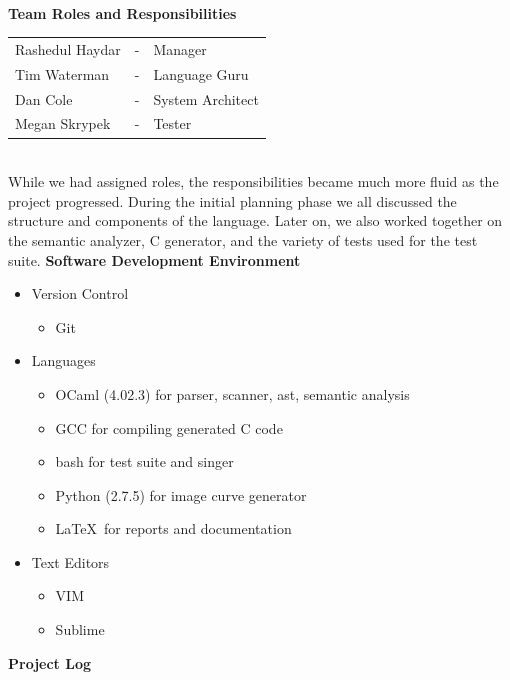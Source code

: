 \documentclass[11pt, oneside]{article}   	%
\newcommand{\tab} {\hspace*{2em}}
\begin{document}
\tab\\[3em]
\Large\textbf{Team Roles and Responsibilities}\\[1em]
\normalsize
\tab\begin{tabular}{l c l}
Rashedul Haydar & - & Manager\\
Tim Waterman & - & Language Guru\\
Dan Cole & - & System Architect\\
Megan Skrypek & - & Tester\\
\end{tabular}\\

While we had assigned roles, the responsibilities became much more fluid as the project progressed. During the initial planning phase we all discussed the structure and components of the language. Later on, we also worked together on the semantic analyzer, C generator, and the variety of tests used for the test suite.
\newpage
\Large\textbf{Software Development Environment}\\[1em]
\normalsize
\begin{itemize}
  \item Version Control
  \begin{itemize}
    \item Git
  \end{itemize}
  \item Languages
  \begin{itemize}
    \item OCaml (4.02.3) for parser, scanner, ast, semantic analysis
    \item GCC for compiling generated C code
    \item bash for test suite and singer
    \item Python (2.7.5) for image curve generator
    \item \LaTeX\ for reports and documentation
  \end{itemize}
  \item Text Editors 
    \begin{itemize}
    \item VIM
    \item Sublime
    \end{itemize}
\end{itemize}

\newpage
\Large\textbf{Project Log}\\[1em]
\normalsize

\end{document}
